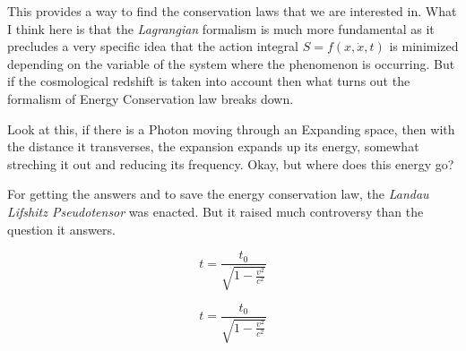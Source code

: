 \documentclass[11pt,a4paper]{article}
\begin{document}
This provides a way to find the conservation laws that we are interested in. What I think here is that the \emph{Lagrangian} formalism is much more fundamental as it precludes a very specific idea that the action integral $S = f(x,\dot{x},t)$ is minimized depending on the variable of the system where the phenomenon is occurring. But if the cosmological redshift is taken into account then what turns out the formalism of Energy Conservation law breaks down.

Look at this, if there is a Photon moving through an Expanding space, then with the distance it transverses, the expansion expands up its energy, somewhat streching it out and reducing its frequency. Okay, but where does this energy go?

For getting the answers and to save the energy conservation law, the \emph{Landau Lifshitz Pseudotensor} was enacted. But it raised much controversy than the question it answers.


\newpage
\begin{equation}
t =
\frac{t_0}{ \sqrt{ 1 - \frac{v^2}{c^2}  }}
\end{equation}

\begin{equation}
t = \frac{t_0}{  \sqrt{1 - \frac{v^2}{c^2}}}
\end{equation}
\end{document}
